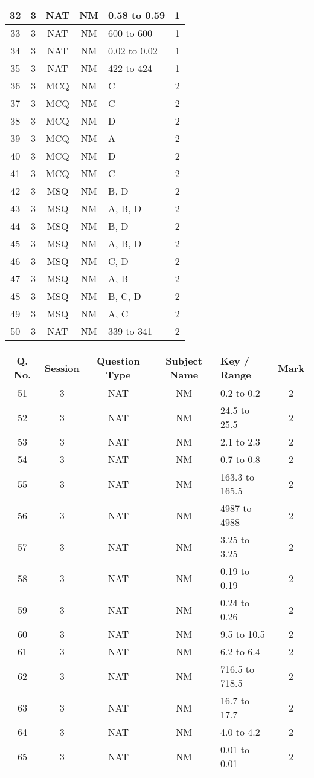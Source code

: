 \begin{tabular}[12pt]{|c|c|c|c|l|c|}
\hline
32 & 3 & NAT & NM & 0.58 to 0.59 & 1 \\
\hline
33 & 3 & NAT & NM & 600 to 600 & 1 \\
\hline
34 & 3 & NAT & NM & 0.02 to 0.02 & 1 \\
\hline
35 & 3 & NAT & NM & 422 to 424 & 1 \\
\hline
36 & 3 & MCQ & NM & C & 2 \\
\hline
37 & 3 & MCQ & NM & C & 2 \\
\hline
38 & 3 & MCQ & NM & D & 2 \\
\hline
39 & 3 & MCQ & NM & A & 2 \\
\hline
40 & 3 & MCQ & NM & D & 2 \\
\hline
41 & 3 & MCQ & NM & C & 2 \\
\hline
42 & 3 & MSQ & NM & B, D & 2 \\
\hline
43 & 3 & MSQ & NM & A, B, D & 2 \\
\hline
44 & 3 & MSQ & NM & B, D & 2 \\
\hline
45 & 3 & MSQ & NM & A, B, D & 2 \\
\hline
46 & 3 & MSQ & NM & C, D & 2 \\
\hline
47 & 3 & MSQ & NM & A, B & 2 \\
\hline
48 & 3 & MSQ & NM & B, C, D & 2 \\
\hline
49 & 3 & MSQ & NM & A, C & 2 \\
\hline
50 & 3 & NAT & NM & 339 to 341 & 2 \\
\hline
\end{tabular}
\newpage
\begin{tabular}[12pt]{|c|c|c|c|l|c|}
\hline
	Q. No. & Session & Question Type & Subject Name & Key / Range & Mark \\
\hline
51 & 3 & NAT & NM & 0.2 to 0.2 & 2 \\
\hline
52 & 3 & NAT & NM & 24.5 to 25.5 & 2 \\
\hline
53 & 3 & NAT & NM & 2.1 to 2.3 & 2 \\
\hline
54 & 3 & NAT & NM & 0.7 to 0.8 & 2 \\
\hline
55 & 3 & NAT & NM & 163.3 to 165.5 & 2 \\
\hline
56 & 3 & NAT & NM & 4987 to 4988 & 2 \\
\hline
57 & 3 & NAT & NM & 3.25 to 3.25 & 2 \\
\hline
58 & 3 & NAT & NM & 0.19 to 0.19 & 2 \\
\hline
59 & 3 & NAT & NM & 0.24 to 0.26 & 2 \\
\hline
60 & 3 & NAT & NM & 9.5 to 10.5 & 2 \\
\hline
61 & 3 & NAT & NM & 6.2 to 6.4 & 2 \\
\hline
62 & 3 & NAT & NM & 716.5 to 718.5 & 2 \\
\hline
63 & 3 & NAT & NM & 16.7 to 17.7 & 2 \\
\hline
64 & 3 & NAT & NM & 4.0 to 4.2 & 2 \\
\hline
65 & 3 & NAT & NM & 0.01 to 0.01 & 2 \\
\hline
\end{tabular}
